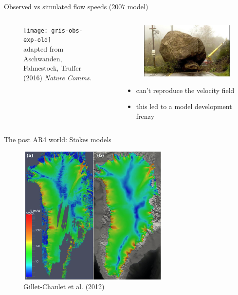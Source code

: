 \documentclass[hide notes,intlimits]{beamer}
\begin{document}
\begin{frame}{Observed vs simulated flow speeds (2007 model)}
  \begin{columns}[c]
    \begin{column}{.6\linewidth}
    \begin{figure}
      \texttt{[image: gris-obs-exp-old]}
      \\ \tiny{adapted from Aschwanden, Fahnestock, Truffer (2016) \textit{Nature Comms.}}
    \end{figure}
    \end{column}
    \begin{column}{.4\linewidth}
      \begin{figure}
        \includegraphics[width=.75\textwidth]{roadblocks}
      \end{figure}
      \begin{itemize}
      \item can't reproduce the velocity field
      \item this led to a model development frenzy
      \end{itemize}
    \end{column}
  \end{columns}
  \note[item]{}
\end{frame}

\begin{frame}{The post AR4 world: Stokes models}
    \begin{figure}
      \includegraphics[height=7cm]{gillet-chaulet_2012_fig_1}
      \\ \tiny{Gillet-Chaulet et al. (2012)}
    \end{figure}

\end{frame}
\end{document}
